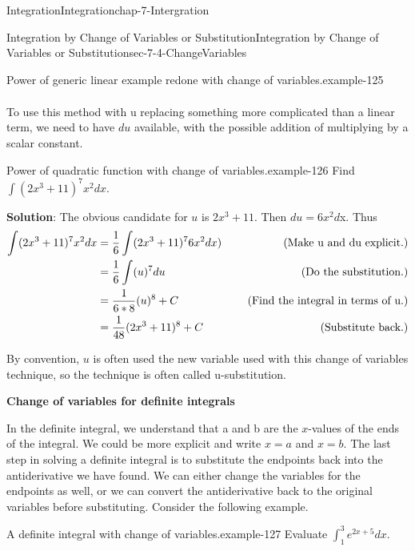 \documentclass[oneside,10pt,]{book}
\newcommand{\terminology}[1]{\textbf{#1}}
\numberwithin{equation}{section}
\newcommand{\amp}{&}
\begin{document}
\begin{chapterptx}{Integration}{}{Integration}{}{}{chap-7-Intergration}
\begin{sectionptx}{Integration by Change of Variables or Substitution}{}{Integration by Change of Variables or Substitution}{}{}{sec-7-4-ChangeVariables}
\begin{example}{Power of generic linear example redone with change of variables.}{example-125}
\begin{equation*}
\begin{aligned}
\end{aligned}
\end{equation*}
\end{example}
\hypertarget{p-2843}{}%
To use this method with u replacing something more complicated than a linear term, we need to have \(du\) available, with the possible addition of multiplying by a scalar constant.%
\begin{example}{Power of quadratic function with change of variables.}{example-126}%
\hypertarget{p-2844}{}%
Find \(\int (2x^3+11)^7 x^2 dx\).%
\par
\hypertarget{p-2845}{}%
\terminology{Solution}:  The obvious candidate for \(u\) is \(2x^3+11\).  Then \(du=6x^2d\)x.  Thus%
%
\begin{equation*}
\begin{aligned}  \int (2x^3+11)^7 x^2 dx
\amp =\frac{1}{6} \int (2x^3+11)^7 6x^2 dx)
\amp \quad \hbox{ (Make u and du explicit.)}\\ 
\amp =\frac{1}{6} \int (u)^7  du
\amp \quad \hbox{ (Do the substitution.)}\\ 
\amp =\frac{1}{6*8} (u)^8+C
\amp \quad \hbox{ (Find the integral in terms of u.)}\\ 
\amp =\frac{1}{48} (2x^3+11)^8+C
\amp \quad \hbox{ (Substitute back.)}\\ 
\end{aligned}
\end{equation*}
\end{example}
\hypertarget{p-2846}{}%
By convention, \(u\) is often used the new variable used with this change of variables technique, so the technique is often called u-substitution.%
\par
\hypertarget{p-2847}{}%
\terminology{Change of variables for definite integrals}%
\par
\hypertarget{p-2848}{}%
In the definite integral, we understand that a and b are the \(x\)-values of the ends of the integral.  We could be more explicit and write \(x=a\) and \(x=b\).  The last step in solving a definite integral is to substitute the endpoints back into the antiderivative we have found.  We can either change the variables for the endpoints as well, or we can convert the antiderivative back to the original variables before substituting.  Consider the following example.%
\begin{example}{A definite integral with change of variables.}{example-127}%
\hypertarget{p-2849}{}%
Evaluate \(\int_1^3 e^{2x+5} dx\).%
\par
\hypertarget{p-2850}{}%

\end{example}
\end{sectionptx}
\end{chapterptx}
\end{document}
